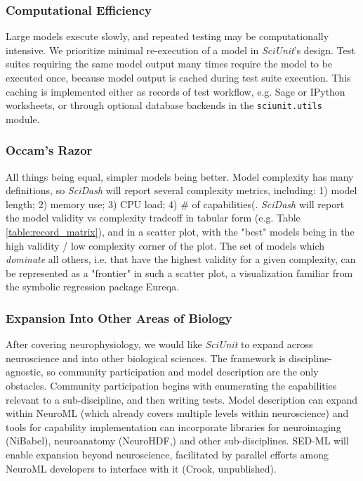 \documentclass[11pt,letterpaper]{article}
\let\verbx\lstinline
\begin{document}
\subsubsection{Computational Efficiency}
Large models execute slowly, and repeated testing may be computationally intensive.  We prioritize minimal re-execution of a model in \textit{SciUnit}'s design.  Test suites requiring the same model output many times require the model to be executed once, because model output is cached during test suite execution.  This caching is implemented either as records of test workflow, e.g. Sage or IPython worksheets, or through optional database backends in the \verbx{sciunit.utils} module.  

\subsubsection{Occam's Razor}
All things being equal, simpler models being better.  Model complexity has many definitions, so \textit{SciDash} will report several complexity metrics, including: 1) model length; 2) memory use; 3) CPU load; 4) \# of capabilities(\cite{mccabe_complexity_1976}.  \textit{SciDash} will report the model validity vs complexity tradeoff in tabular form (e.g. Table \ref{table:record_matrix}), and in a scatter plot, with the "best" models being in the high validity / low complexity corner of the plot.  The set of models which \textit{dominate} all others, i.e. that have the highest validity for a given complexity, can be represented as a "frontier" in such a scatter plot, a visualization familiar from the symbolic regression package Eureqa\cite{schmidt_distilling_2009}.  

\subsubsection{Expansion Into Other Areas of Biology}
After covering neurophysiology, we would like \textit{SciUnit} to expand across neuroscience and into other biological sciences.  The framework is discipline-agnostic, so community participation and model description are the only obstacles.  Community participation begins with enumerating the capabilities relevant to a sub-discipline, and then writing tests.  Model description can expand within NeuroML (which already covers multiple levels within neuroscience) and tools for capability implementation can incorporate libraries for neuroimaging (NiBabel\cite{nibabel_url}), neuroanatomy (NeuroHDF,\cite{neurohdf_url}) and other sub-disciplines.  SED-ML\cite{hucka_systems_2003,sedml_url} will enable expansion beyond neuroscience, facilitated by parallel efforts among NeuroML developers to interface with it (Crook, unpublished).    
\end{document}
